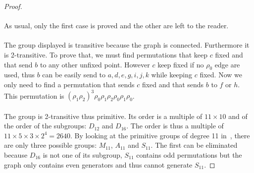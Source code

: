 \begin{proof}
\begin{figure}[H]
\begin{center}
      \caption{}
    \end{center}
  \end{figure}

  \paragraph{}
  As usual, only the first case is proved and the other are left to the reader.

  \paragraph{}
  The group displayed is transitive because the graph is connected. Furthermore it is 2-transitive. To prove that, we must find permutations that keep $c$ fixed and that send $b$ to any other unfixed point. However $c$ keep fixed if no $\rho_0$ edge are used, thus $b$ can be easily send to $a,d,e,g,i,j,k$ while keeping $c$ fixed. Now we only need to find a permutation that sends $c$ fixed and that sends $b$ to $f$ or $h$. This permutation is $(\rho_1\rho_2)^3\rho_0\rho_1\rho_2\rho_0\rho_1\rho_0$.

  \paragraph{}
  The group is 2-transitive thus primitive. Its order is a multiple of $11 \times 10$ and of the order of the subgroups: $D_{12}$ and $D_{16}$. The order is thus a multiple of $11 \times 5 \times 3 \times 2^4 = 2640$. By looking at the primitive groups of degree 11 in~\cite{buekenhout1996list}, there are only three possible groups: $M_{11}$, $A_{11}$ and $S_{11}$. The first can be eliminated because $D_{16}$ is not one of its subgroup, $S_{11}$ contains odd permutations but the graph only contains even generators and thus cannot generate $S_{11}$.


\end{proof}
